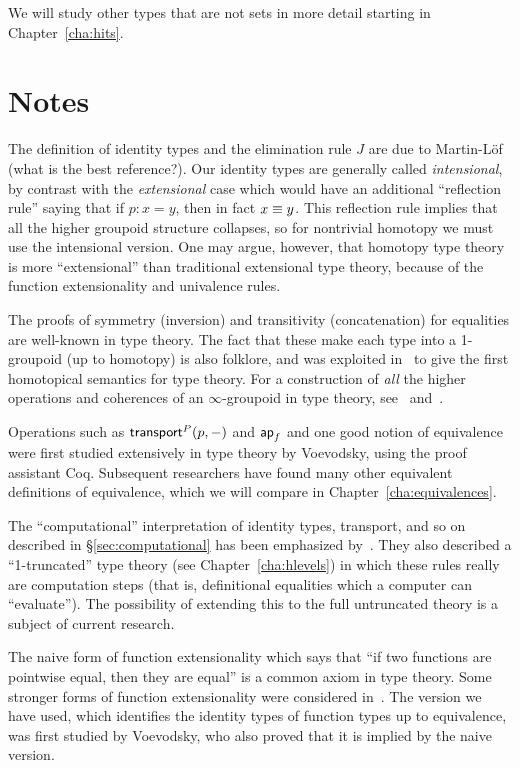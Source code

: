 We will study other types that are not sets in more detail starting in Chapter~\ref{cha:hits}.


\section*{Notes}
\label{sec:notes}

The definition of identity types and the elimination rule $J$ are due to Martin-L\"of (what is the best reference?).
Our identity types are generally called \emph{intensional}, by contrast with the \emph{extensional} case which would have an additional ``reflection rule'' saying that if $p:x=y$, then in fact $x\equiv y$.
This reflection rule implies that all the higher groupoid structure collapses, so for nontrivial homotopy we must use the intensional version.
One may argue, however, that homotopy type theory is more ``extensional'' than traditional extensional type theory, because of the function extensionality and univalence rules.

The proofs of symmetry (inversion) and transitivity (concatenation) for equalities are well-known in type theory.
The fact that these make each type into a 1-groupoid (up to homotopy) is also folklore, and was exploited in~\cite{hs:gpd-typethy} to give the first homotopical semantics for type theory.
For a construction of \emph{all} the higher operations and coherences of an $\infty$-groupoid in type theory, see~\cite{pll:wkom-type} and~\cite{bg:type-wkom}.

Operations such as $\mathsf{transport}^{P}(p,-)$ and $\mathsf{ap}_{f}$ and one good notion of equivalence were first studied extensively in type theory by Voevodsky, using the proof assistant Coq.
Subsequent researchers have found many other equivalent definitions of equivalence, which we will compare in Chapter~\ref{cha:equivalences}.

The ``computational'' interpretation of identity types, transport, and so on described in \S\ref{sec:computational} has been emphasized by~\cite{lh:canonicity}.
They also described a ``1-truncated'' type theory (see Chapter~\ref{cha:hlevels}) in which these rules really are computation steps (that is, definitional equalities which a computer can ``evaluate'').
The possibility of extending this to the full untruncated theory is a subject of current research.

The naive form of function extensionality which says that ``if two functions are pointwise equal, then they are equal'' is a common axiom in type theory.
Some stronger forms of function extensionality were considered in~\cite{garner:depprod}.
The version we have used, which identifies the identity types of function types up to equivalence, was first studied by Voevodsky, who also proved that it is implied by the naive version.

